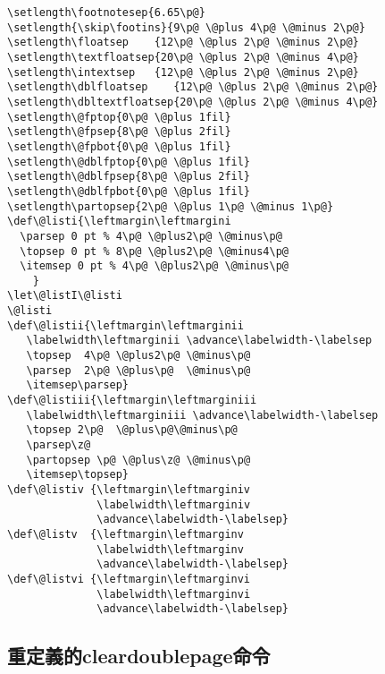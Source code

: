 \begin{lstlisting}[firstnumber=231]
\setlength\footnotesep{6.65\p@}
\setlength{\skip\footins}{9\p@ \@plus 4\p@ \@minus 2\p@}
\setlength\floatsep    {12\p@ \@plus 2\p@ \@minus 2\p@}
\setlength\textfloatsep{20\p@ \@plus 2\p@ \@minus 4\p@}
\setlength\intextsep   {12\p@ \@plus 2\p@ \@minus 2\p@}
\setlength\dblfloatsep    {12\p@ \@plus 2\p@ \@minus 2\p@}
\setlength\dbltextfloatsep{20\p@ \@plus 2\p@ \@minus 4\p@}
\setlength\@fptop{0\p@ \@plus 1fil}
\setlength\@fpsep{8\p@ \@plus 2fil}
\setlength\@fpbot{0\p@ \@plus 1fil}
\setlength\@dblfptop{0\p@ \@plus 1fil}
\setlength\@dblfpsep{8\p@ \@plus 2fil}
\setlength\@dblfpbot{0\p@ \@plus 1fil}
\setlength\partopsep{2\p@ \@plus 1\p@ \@minus 1\p@}
\def\@listi{\leftmargin\leftmargini
  \parsep 0 pt % 4\p@ \@plus2\p@ \@minus\p@
  \topsep 0 pt % 8\p@ \@plus2\p@ \@minus4\p@
  \itemsep 0 pt % 4\p@ \@plus2\p@ \@minus\p@
  	}
\let\@listI\@listi
\@listi
\def\@listii{\leftmargin\leftmarginii
   \labelwidth\leftmarginii \advance\labelwidth-\labelsep
   \topsep  4\p@ \@plus2\p@ \@minus\p@
   \parsep  2\p@ \@plus\p@  \@minus\p@
   \itemsep\parsep}
\def\@listiii{\leftmargin\leftmarginiii
   \labelwidth\leftmarginiii \advance\labelwidth-\labelsep
   \topsep 2\p@  \@plus\p@\@minus\p@
   \parsep\z@
   \partopsep \p@ \@plus\z@ \@minus\p@
   \itemsep\topsep}
\def\@listiv {\leftmargin\leftmarginiv
              \labelwidth\leftmarginiv
              \advance\labelwidth-\labelsep}
\def\@listv  {\leftmargin\leftmarginv
              \labelwidth\leftmarginv
              \advance\labelwidth-\labelsep}
\def\@listvi {\leftmargin\leftmarginvi
              \labelwidth\leftmarginvi
              \advance\labelwidth-\labelsep}
\end{lstlisting}

\subsection{重定義的cleardoublepage命令}


